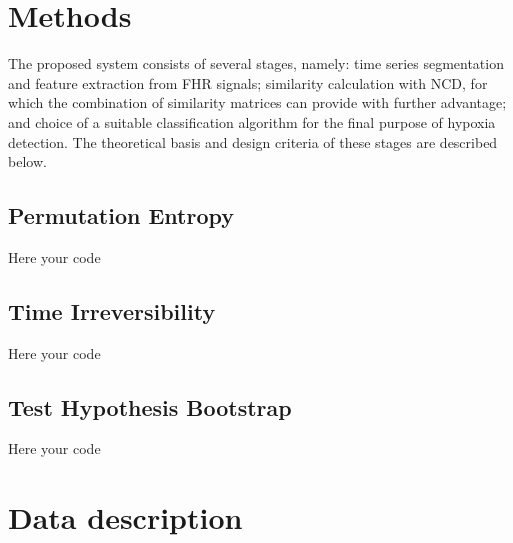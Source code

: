 	\section{Methods} \label{sec:system}


The proposed system consists of several stages, namely: time series segmentation and feature extraction from  FHR signals; similarity calculation with NCD, for which the combination of similarity matrices can provide with further advantage; and choice of a suitable classification algorithm for the final purpose of hypoxia detection. The theoretical basis and design criteria of these stages are described below.



\subsection{Permutation Entropy}

Here your code





\subsection{Time Irreversibility}
Here your code


\subsection{Test Hypothesis Bootstrap}
Here your code




\section{Data description}\label{sec:data}

